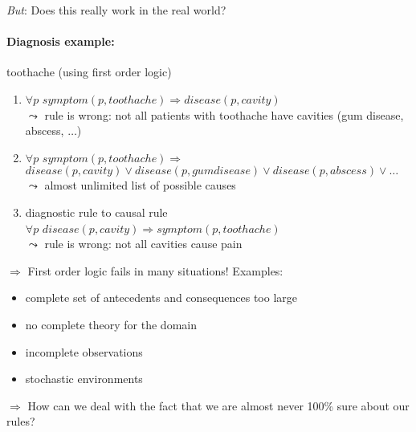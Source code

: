 \emph{But}: Does this really work in the real world?

\paragraph{Diagnosis example:} toothache (using first order logic)
\begin{enumerate}[(1)]
\item $\forall p$ $symptom(p, toothache) \Rightarrow disease(p,cavity)$ \\
\indent $\leadsto$ rule is wrong: not all patients with toothache have cavities (gum disease, abscess, $\ldots$)
\item $\forall p$ $symptom(p, toothache) \Rightarrow$ \\
 $disease(p, cavity) \lor disease(p, gum disease) \lor disease(p, abscess) \lor \ldots$ \\
$\leadsto$ almost unlimited list of possible causes
\item diagnostic rule to causal rule \\
 $\forall p$ $disease(p, cavity) \Rightarrow symptom(p, toothache)$ \\
$\leadsto$ rule is wrong: not all cavities cause pain
\end{enumerate}
$\Rightarrow$ First order logic fails in many situations! Examples:
\begin{itemize}
	\item complete set of antecedents and consequences too large
	\item no complete theory for the domain
	\item incomplete observations
	\item stochastic environments
\end{itemize}
$\Rightarrow$ How can we deal with the fact that we are almost never 100\% sure
about our rules?
